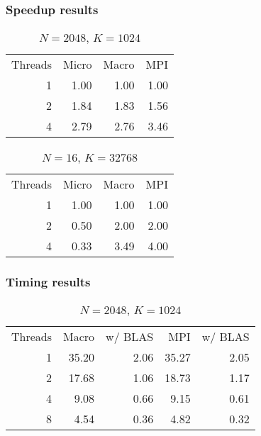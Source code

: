 \begin{frame}
  \frametitle{Speedup results}
  \begin{center}
    \begin{table}
      \caption{$N=2048$, $K=1024$}
      \bgroup{}
      \begin{tabular}{rrrr}
        \hline
        Threads & Micro & Macro & MPI \\
        \hhline{====}
        1 & 1.00 & 1.00 & 1.00 \\
        2 & 1.84 & 1.83 & 1.56 \\
        4 & 2.79 & 2.76 & 3.46 \\
        \hline
      \end{tabular}
      \egroup
    \end{table}
    \begin{table}
      \caption{$N=16$, $K=32768$}
      \bgroup{}
      \begin{tabular}{rrrr}
        \hline
        Threads & Micro & Macro & MPI \\
        \hhline{====}
        1 & 1.00 & 1.00 & 1.00 \\
        2 & 0.50 & 2.00 & 2.00 \\
        4 & 0.33 & 3.49 & 4.00 \\
        \hline
      \end{tabular}
      \egroup
    \end{table}
  \end{center}
\end{frame}

\begin{frame}
  \frametitle{Timing results}
  \begin{center}
    \begin{table}
      \caption{$N=2048$, $K=1024$}
      \bgroup{}
      \begin{tabular}{rrrrr}
        \hline
        Threads & Macro & w/ BLAS & MPI & w/ BLAS \\
        \hhline{=====}
        1 & 35.20 & 2.06 & 35.27 & 2.05 \\
        2 & 17.68 & 1.06 & 18.73 & 1.17 \\
        4 &  9.08 & 0.66 &  9.15 & 0.61 \\
        8 &  4.54 & 0.36 &  4.82 & 0.32 \\
        \hline
      \end{tabular}
      \egroup
    \end{table}
  \end{center}
\end{frame}

